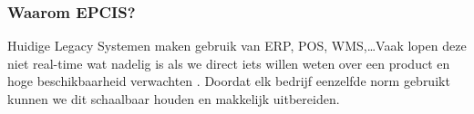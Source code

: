 \subsubsection{Waarom EPCIS?}
Huidige Legacy Systemen maken gebruik van ERP, POS, WMS,\dots Vaak lopen deze niet real-time wat nadelig is als we direct iets willen weten over een product en hoge beschikbaarheid verwachten \autocite{Vieweger}.
Doordat elk bedrijf eenzelfde norm gebruikt kunnen we dit schaalbaar houden en makkelijk uitbereiden.









\newpage
